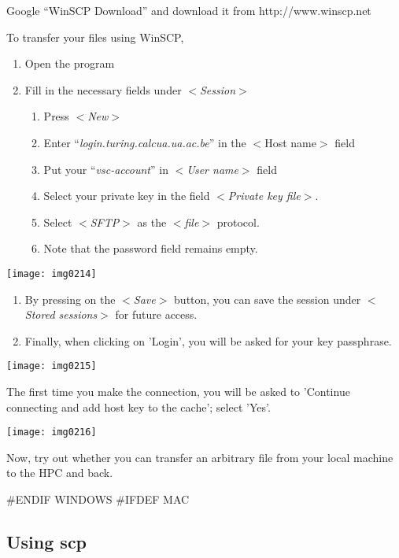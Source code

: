 Google ``WinSCP Download'' and download it from http://www.winscp.net

To transfer your files using WinSCP,

\begin{enumerate}
\item  Open the program
\item  Fill in the necessary fields under $<$\textit{Session}$>$
\begin{enumerate}
\item  Press $<$\textit{New}$>$
\item  Enter ``\textit{login.turing.calcua.ua.ac.be}'' in the $<$Host name$>$ field
\item  Put your ``\textit{vsc-account}'' in $<$\textit{User name}$>$ field
\item  Select your private key in the field $<$\textit{Private key file}$>$.
\item  Select $<$\textit{SFTP}$>$ as the $<$\textit{file}$>$ protocol.
\item  Note that the password field remains empty.
\end{enumerate}
\end{enumerate}

\texttt{[image: img0214]}

\begin{enumerate}
\item  By pressing on the $<$\textit{Save}$>$ button, you can save the session under $<$\textit{Stored sessions}$>$ for future access.
\item  Finally, when clicking on 'Login', you will be asked for your key passphrase.
\end{enumerate}

\texttt{[image: img0215]}

The first time you make the connection, you will be asked to 'Continue connecting and add host key to the cache'; select 'Yes'.

\texttt{[image: img0216]}

Now, try out whether you can transfer an arbitrary file from your local machine to the HPC and back.

\#ENDIF WINDOWS
\#IFDEF MAC

\subsection{Using scp}

